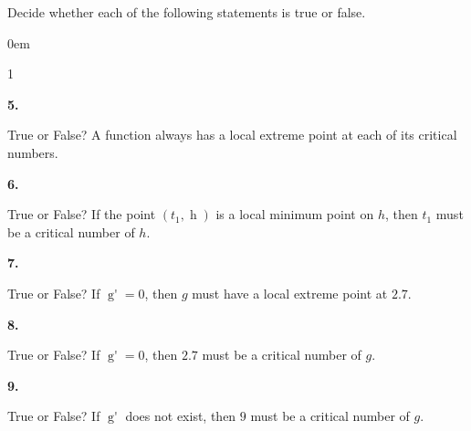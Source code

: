 \documentclass[12pt,]{book}
\theoremstyle{plain}
\theoremstyle{definition}
\numberwithin{equation}{section}
\newenvironment{exercisegroup}%
{\medskip\noindent}%
{\par\bigskip}%
\newlength{\exercisegroupindent}%
\newlength{\exercisegroupitemwidth}%
\newenvironment{exercisegrouplist}%
{\vspace{-\partopsep}%
\begin{adjustwidth}{\exercisegroupindent}{0em}}%
{\end{adjustwidth}%
\vspace{-\partopsep}%
\vspace{\baselineskip}}%
\newenvironment{exercisegroupbycol}[1]%
{\begin{exercisegrouplist}%
\vspace{-\multicolsep}%
\begin{multicols}{#1}%
\setlength{\parindent}{0em}%
\setlength{\exercisegroupitemwidth}{\linewidth}}%
{\end{multicols}%
\vspace{-\multicolsep}%
\end{exercisegrouplist}}%
\newenvironment{exercisegroupitem}[1]%
{\begin{minipage}[t]{\exercisegroupitemwidth}
\vspace{0pt}%
{\bfseries#1}%
\rule{0pt}{\baselineskip}}{\strut%
\end{minipage}%
\hspace{\columnsep}}%
\providecommand\phantomsection{}
\newcommand{\fe}[2]{\mathop{{#1}{\left(#2\right)}}}
\newcommand{\point}[2]{\left(#1,#2\right)}
\newcommand{\fd}[1]{#1'}
\begin{document}
\begin{exercisegroup}%
Decide whether each of the following statements is true or false.%
\par
\begin{exercisegroupbycol}{1}%
\begin{exercisegroupitem}{5. }\phantomsection\hypertarget{exercise-398}{\null}
True or False? A function always has a local extreme point at each of its critical numbers.%
\end{exercisegroupitem}%
\par%
\begin{exercisegroupitem}{6. }\phantomsection\hypertarget{exercise-399}{\null}
True or False? If the point \(\point{t_1}{\fe{h}{t_1}}\) is a local minimum point on \(h\), then \(t_1\) must be a critical number of \(h\).%
\end{exercisegroupitem}%
\par%
\begin{exercisegroupitem}{7. }\phantomsection\hypertarget{exercise-400}{\null}
True or False? If \(\fe{\fd{g}}{2.7}=0\), then \(g\) must have a local extreme point at \(2.7\).%
\end{exercisegroupitem}%
\par%
\begin{exercisegroupitem}{8. }\phantomsection\hypertarget{exercise-401}{\null}
True or False? If \(\fe{\fd{g}}{2.7}=0\), then \(2.7\) must be a critical number of \(g\).%
\end{exercisegroupitem}%
\par%
\begin{exercisegroupitem}{9. }\phantomsection\hypertarget{exercise-402}{\null}
True or False? If \(\fe{\fd{g}}{9}\) does not exist, then \(9\) must be a critical number of \(g\).%
\end{exercisegroupitem}%
\par%
\end{exercisegroupbycol}%
\end{exercisegroup}%
\typeout{************************************************}
\typeout{************************************************}
\end{document}

